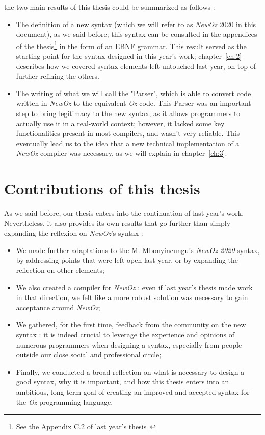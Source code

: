 the two main results of this thesis could be summarized as follows :
\begin{itemize}
    \item The definition of a new syntax (which we will refer to as \textit{NewOz} 2020 in this document), as we said before;
    this syntax can be consulted in the appendices of the thesis\footnote{See the Appendix C.2 of last year's thesis~\cite{jpthesis}} in the form of an EBNF grammar.
    This result served as the starting point for the syntax designed in this year's work;
    chapter~\ref{ch:2} describes how we covered syntax elements left untouched last year, on top of further refining the others.
    \item The writing of what we will call the "Parser", which is able to convert code written in \textit{NewOz} to the equivalent \textit{Oz} code.
    This Parser was an important step to bring legitimacy to the new syntax, as it allows programmers to actually use it in a real-world context;
    however, it lacked some key functionalities present in most compilers, and wasn't very reliable.
    This eventually lead us to the idea that a new technical implementation of a \textit{NewOz} compiler was necessary, as we will explain in chapter~\ref{ch:3}.
\end{itemize}

\section{Contributions of this thesis}\label{sec:ch1-3}
As we said before, our thesis enters into the continuation of last year's work.
Nevertheless, it also provides its own results that go further than simply expanding the reflexion on \textit{NewOz}'s syntax :
\begin{itemize}
    \item We made further adaptations to the M. Mbonyincungu's \textit{NewOz 2020} syntax, by addressing points that were left open last year, or by expanding the reflection on other elements;
    \item We also created a compiler for \textit{NewOz} : even if last year's thesis made work in that direction, we felt like a more robust solution was necessary to gain acceptance around \textit{NewOz};
    \item We gathered, for the first time, feedback from the community on the new syntax : it is indeed crucial to leverage the experience and opinions of numerous programmers when designing a syntax, especially from people outside our close social and professional circle;
    \item Finally, we conducted a broad reflection on what is necessary to design a good syntax, why it is important, and how this thesis enters into an ambitious, long-term goal of creating an improved and accepted syntax for the \textit{Oz} programming language.
\end{itemize}

